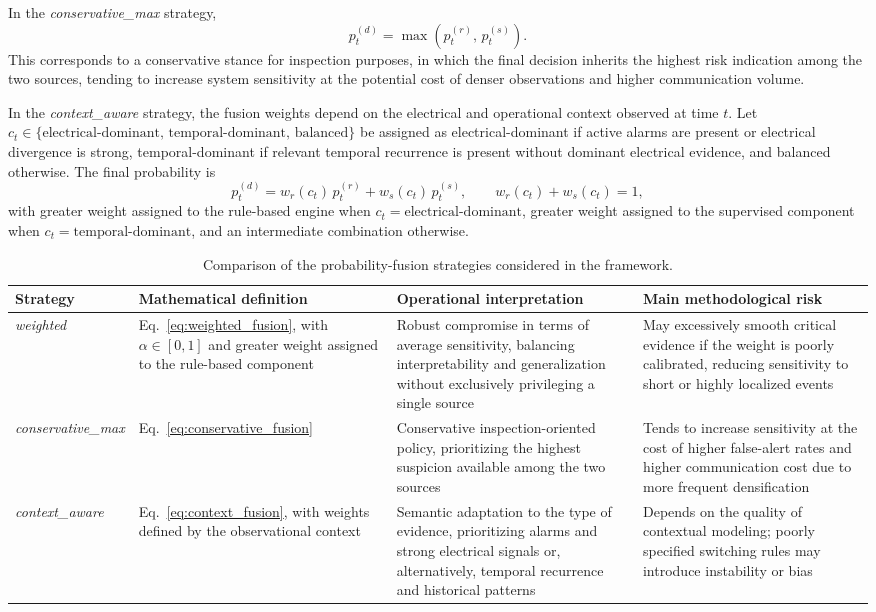 \documentclass{ieeeaccess}
\begin{document}
In the \textit{conservative\_max} strategy,
\begin{equation}
p_t^{(d)} = \max\left(p_t^{(r)},\, p_t^{(s)}\right).
\label{eq:conservative_fusion}
\end{equation}
This corresponds to a conservative stance for inspection purposes, in which the final decision inherits the highest risk indication among the two sources, tending to increase system sensitivity at the potential cost of denser observations and higher communication volume.

In the \textit{context\_aware} strategy, the fusion weights depend on the electrical and operational context observed at time $t$. Let $c_t \in \{\text{electrical-dominant},\, \text{temporal-dominant},\, \text{balanced}\}$ be assigned as electrical-dominant if active alarms are present or electrical divergence is strong, temporal-dominant if relevant temporal recurrence is present without dominant electrical evidence, and balanced otherwise. The final probability is
\begin{equation}
p_t^{(d)} = w_r(c_t)\, p_t^{(r)} + w_s(c_t)\, p_t^{(s)}, \qquad w_r(c_t) + w_s(c_t) = 1,
\label{eq:context_fusion}
\end{equation}
with greater weight assigned to the rule-based engine when $c_t = \text{electrical-dominant}$, greater weight assigned to the supervised component when $c_t = \text{temporal-dominant}$, and an intermediate combination otherwise.

\begin{table}[ht]
\centering
\caption{Comparison of the probability-fusion strategies considered in the framework.}
\label{tab:fusion_strategies}
\begin{tabular}{p{2.0cm} p{4.2cm} p{4.4cm} p{4.6cm}}
\hline
\textbf{Strategy} & \textbf{Mathematical definition} & \textbf{Operational interpretation} & \textbf{Main methodological risk} \\
\hline
\textit{weighted} & Eq.~\eqref{eq:weighted_fusion}, with $\alpha \in [0,1]$ and greater weight assigned to the rule-based component & Robust compromise in terms of average sensitivity, balancing interpretability and generalization without exclusively privileging a single source & May excessively smooth critical evidence if the weight is poorly calibrated, reducing sensitivity to short or highly localized events \\
\textit{conservative\_max} & Eq.~\eqref{eq:conservative_fusion} & Conservative inspection-oriented policy, prioritizing the highest suspicion available among the two sources & Tends to increase sensitivity at the cost of higher false-alert rates and higher communication cost due to more frequent densification \\
\textit{context\_aware} & Eq.~\eqref{eq:context_fusion}, with weights defined by the observational context & Semantic adaptation to the type of evidence, prioritizing alarms and strong electrical signals or, alternatively, temporal recurrence and historical patterns & Depends on the quality of contextual modeling; poorly specified switching rules may introduce instability or bias \\
\hline
\end{tabular}
\end{table}
\end{document}
